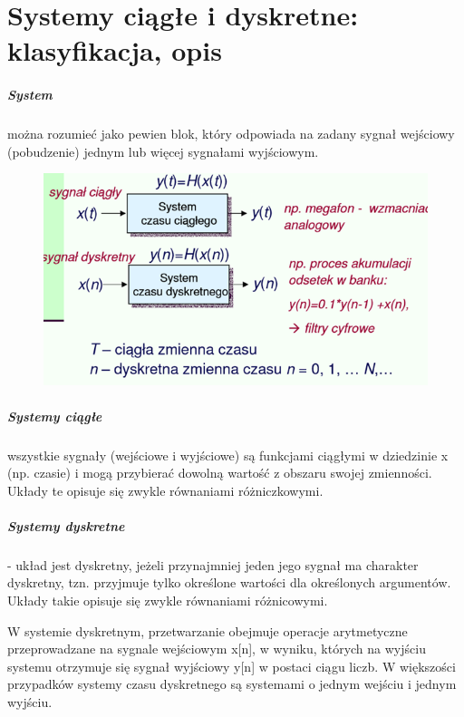 \documentclass[a4paper,twoside]{report}
\begin{document}
\chapter{Systemy ciągłe i dyskretne: klasyfikacja, opis}

\paragraph{System} można rozumieć jako pewien  blok, który odpowiada na zadany sygnał wejściowy (pobudzenie) jednym lub więcej sygnałami wyjściowym.

\begin{figure}[htbp]
\centering
\includegraphics[scale=0.5]{obrazy/ciagle_dyskretne.png}
\end{figure}

\paragraph{Systemy ciągłe} wszystkie sygnały (wejściowe i wyjściowe) są funkcjami ciągłymi w dziedzinie x (np. czasie) i mogą przybierać dowolną wartość z obszaru swojej zmienności. Układy te opisuje się zwykle równaniami różniczkowymi. 

\paragraph{Systemy dyskretne} - układ jest dyskretny, jeżeli przynajmniej jeden jego sygnał ma charakter dyskretny, tzn. przyjmuje tylko określone wartości dla określonych argumentów. Układy takie opisuje się zwykle równaniami różnicowymi. 

W systemie dyskretnym, przetwarzanie
obejmuje operacje arytmetyczne 
przeprowadzane na sygnale wejściowym 
x[n], w wyniku, których na wyjściu systemu otrzymuje się sygnał wyjściowy y[n] w postaci ciągu liczb. W większości przypadków systemy czasu dyskretnego są systemami o jednym wejściu i jednym wyjściu.
\end{document}
